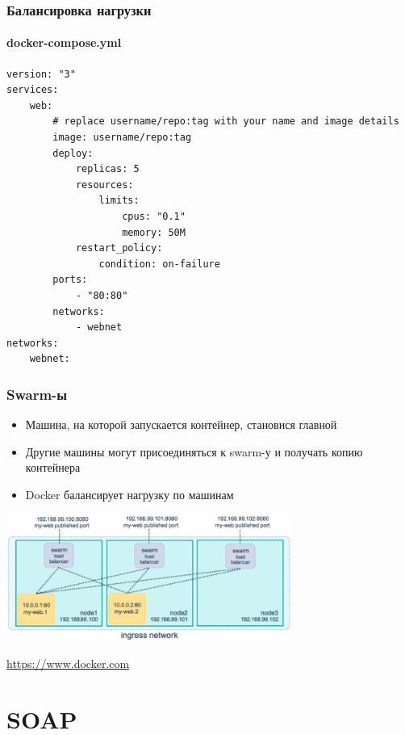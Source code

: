 \documentclass[xetex,mathserif,serif]{beamer}
\newcommand{\attribution}[1] {
	\begin{flushright}\begin{scriptsize}\textcolor{gray}{\textcopyright\; #1}\end{scriptsize}\end{flushright}
}
\begin{document}
	\begin{frame}[fragile]
		\frametitle{Балансировка нагрузки}
		\framesubtitle{docker-compose.yml}
		\begin{scriptsize}
			\begin{verbatim}
version: "3"
services:
    web:
        # replace username/repo:tag with your name and image details
        image: username/repo:tag
        deploy:
            replicas: 5
            resources:
                limits:
                    cpus: "0.1"
                    memory: 50M
            restart_policy:
                condition: on-failure
        ports:
            - "80:80"
        networks:
            - webnet
networks:
    webnet:
			\end{verbatim}
		\end{scriptsize}
	\end{frame}

	\begin{frame}
		\frametitle{Swarm-ы}
		\begin{itemize}
			\item Машина, на которой запускается контейнер, становися главной
			\item Другие машины могут присоединяться к swarm-у и получать копию контейнера
			\item Docker балансирует нагрузку по машинам
		\end{itemize}
		\begin{center}
			\includegraphics[width=0.7\textwidth]{swarmLoadBalancing.png}
			\attribution{\url{https://www.docker.com}}
		\end{center}
	\end{frame}

	\section{SOAP}
\end{document}
